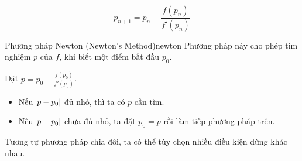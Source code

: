 \documentclass[../../Lectures]{subfiles}
\begin{document}
\begin{equation}\label{eq:newton_sequence_function}
    p_{n + 1} = p_n - \frac{f(p_n)}{f'(p_n)}
\end{equation}


\begin{cmethod}{Phương pháp Newton (Newton's Method)}{newton}
    Phương pháp này cho phép tìm nghiệm \(p\) của \(f\), khi biết một điểm bắt
    đầu \(p_0\).

    Đặt \(p = p_0 - \frac{f(p_0)}{f'(p_0)}\).

    \begin{itemize}
        \item Nếu \(\abs{p - p_0}\) đủ nhỏ, thì ta có \(p\) cần tìm.
        \item Nếu \(\abs{p - p_0}\) chưa đủ nhỏ, ta đặt \(p_0 = p\) rồi làm tiếp
            phương pháp trên.
    \end{itemize}
\end{cmethod}

Tương tự phương pháp chia đôi, ta có thể tùy chọn nhiều điều kiện dừng khác
nhau.
\end{document}
